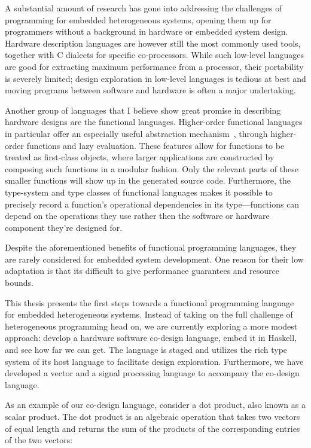 \documentclass[../paper.tex]{subfiles}
\begin{document}
A substantial amount of research has gone into addressing the challenges of programming for embedded heterogeneous systems, opening them up for programmers without a background in hardware or embedded system design. Hardware description languages are however still the most commonly used tools, together with C dialects for specific co-processors. While such low-level languages are good for extracting maximum performance from a processor, their portability is severely limited; design exploration in low-level languages is tedious at best and moving programs between software and hardware is often a major undertaking.

Another group of languages that I believe show great promise in describing hardware designs are the functional languages. Higher-order functional languages in particular offer an especially useful abstraction mechanism~\cite{baaij2010, bjesse1998, gill2010}, through higher-order functions and lazy evaluation. These features allow for functions to be treated as first-class objects, where larger applications are constructed by composing such functions in a modular fashion. Only the relevant parts of these smaller functions will show up in the generated source code. Furthermore, the type-system and type classes of functional languages makes it possible to precisely record a function's operational dependencies in its type---functions can depend on the operations they use rather then the software or hardware component they're designed for.

Despite the aforementioned benefits of functional programming languages, they are rarely considered for embedded system development. One reason for their low adaptation is that its difficult to give performance guarantees and resource bounds.

This thesis presents the first steps towards a functional programming language for embedded heterogeneous systems. Instead of taking on the full challenge of heterogeneous programming head on, we are currently exploring a more modest approach: develop a hardware software co-design language, embed it in Haskell, and see how far we can get. The language is staged and utilizes the rich type system of its host language to facilitate design exploration. Furthermore, we have developed a vector and a signal processing language to accompany the co-design language.

As an example of our co-design language, consider a dot product, also known as a scalar product. The dot product is an algebraic operation that takes two vectors of equal length and returns the sum of the products of the corresponding entries of the two vectors:
\end{document}
